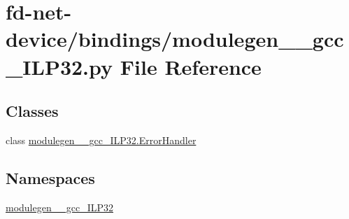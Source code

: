 \hypertarget{fd-net-device_2bindings_2modulegen____gcc__ILP32_8py}{}\section{fd-\/net-\/device/bindings/modulegen\+\_\+\+\_\+gcc\+\_\+\+I\+L\+P32.py File Reference}
\label{fd-net-device_2bindings_2modulegen____gcc__ILP32_8py}
\subsection*{Classes}
\begin{DoxyCompactItemize}
\item 
class \hyperlink{classmodulegen____gcc__ILP32_1_1ErrorHandler}{modulegen\+\_\+\+\_\+gcc\+\_\+\+I\+L\+P32.\+Error\+Handler}
\end{DoxyCompactItemize}
\subsection*{Namespaces}
\begin{DoxyCompactItemize}
\item 
 \hyperlink{namespacemodulegen____gcc__ILP32}{modulegen\+\_\+\+\_\+gcc\+\_\+\+I\+L\+P32}
\end{DoxyCompactItemize}
